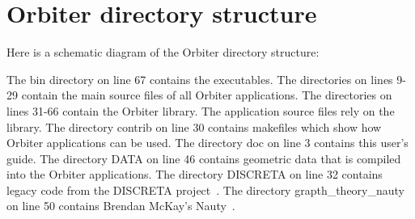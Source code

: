 \section{Orbiter directory structure}
\label{app:dir}

Here is a schematic diagram of the Orbiter directory structure:
{\tt

}
The bin directory on line 67 contains the executables.
The directories on lines 9-29 contain the main source files of all Orbiter applications. 
The directories on lines 31-66 contain the Orbiter library. 
The application source files rely on the library.
The directory contrib on line 30 contains makefiles which show how Orbiter applications can be used. 
The directory doc on line 3 contains this user's guide.
The directory DATA on line 46 contains geometric data that is compiled into the Orbiter applications.
The directory DISCRETA on line 32 contains legacy code from the DISCRETA project~\cite{DISCRETA}.
The directory grapth\_theory\_nauty on line 50 contains Brendan McKay's Nauty~\cite{Nauty2016}.